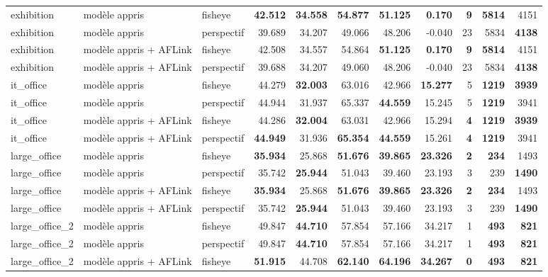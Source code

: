\documentclass[11pt,a4paper]{article}
\begin{document}
\begin{table}[H]
{\begin{tabular}{l l l r r r r r r r r}
exhibition & modèle appris & fisheye & \textbf{42.512} & \textbf{34.558} & \textbf{54.877} & \textbf{51.125} & \textbf{0.170} & \textbf{9} & \textbf{5814} & 4151 \\
exhibition & modèle appris & perspectif & 39.689 & 34.207 & 49.066 & 48.206 & -0.040 & 23 & 5834 & \textbf{4138} \\
exhibition & modèle appris + AFLink & fisheye & 42.508 & 34.557 & 54.864 & \textbf{51.125} & \textbf{0.170} & \textbf{9} & \textbf{5814} & 4151 \\
exhibition & modèle appris + AFLink & perspectif & 39.688 & 34.207 & 49.060 & 48.206 & -0.040 & 23 & 5834 & \textbf{4138} \\
\midrule
it\_office & modèle appris & fisheye & 44.279 & \textbf{32.003} & 63.016 & 42.966 & \textbf{15.277} & 5 & \textbf{1219} & \textbf{3939} \\
it\_office & modèle appris & perspectif & 44.944 & 31.937 & 65.337 & \textbf{44.559} & 15.245 & 5 & \textbf{1219} & 3941 \\
it\_office & modèle appris + AFLink & fisheye & 44.286 & \textbf{32.004} & 63.031 & 42.966 & 15.294 & \textbf{4} & \textbf{1219} & \textbf{3939} \\
it\_office & modèle appris + AFLink & perspectif & \textbf{44.949} & 31.936 & \textbf{65.354} & \textbf{44.559} & 15.261 & \textbf{4} & \textbf{1219} & 3941 \\
\midrule
large\_office & modèle appris & fisheye & \textbf{35.934} & 25.868 & \textbf{51.676} & \textbf{39.865} & \textbf{23.326} & \textbf{2} & \textbf{234} & 1493 \\
large\_office & modèle appris & perspectif & 35.742 & \textbf{25.944} & 51.043 & 39.460 & 23.193 & 3 & 239 & \textbf{1490} \\
large\_office & modèle appris + AFLink & fisheye & \textbf{35.934} & 25.868 & \textbf{51.676} & \textbf{39.865} & \textbf{23.326} & \textbf{2} & \textbf{234} & 1493 \\
large\_office & modèle appris + AFLink & perspectif & 35.742 & \textbf{25.944} & 51.043 & 39.460 & 23.193 & 3 & 239 & \textbf{1490} \\
\midrule
large\_office\_2 & modèle appris & fisheye & 49.847 & \textbf{44.710} & 57.854 & 57.166 & 34.217 & 1 & \textbf{493} & \textbf{821} \\
large\_office\_2 & modèle appris & perspectif & 49.847 & \textbf{44.710} & 57.854 & 57.166 & 34.217 & 1 & \textbf{493} & \textbf{821} \\
large\_office\_2 & modèle appris + AFLink & fisheye & \textbf{51.915} & 44.708 & \textbf{62.140} & \textbf{64.196} & \textbf{34.267} & \textbf{0} & \textbf{493} & \textbf{821} \\

\end{tabular}}
\end{table}
\end{document}
